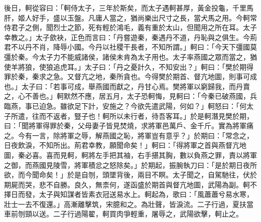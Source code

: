 \documentclass[12pt]{book}
\begin{document}
\begin{pairs}
\begin{Rightside}
\begin{chinese}
\beginnumbering
\pstart
後日，軻從容曰：「軻侍太子，三年於斯矣，而太子遇軻甚厚，黃金投龜，千里馬肝，姬人好手，盛以玉盤。凡庸人當之，猶尚樂出尺寸之長，當犬馬之用。今軻常侍君子之側，聞烈士之節，死有輕於鴻毛，義有重於太山，但聞用之所在耳。太子幸教之。」太子歛袂，正色而言曰：「丹嘗遊秦，秦遇丹不道，丹恥與之俱生。今荊君不以丹不肖，降辱小國。今丹以社稷干長者，不知所謂。」軻曰：「今天下彊國莫彊於秦。今太子力不能威諸侯，諸侯未肯為太子用也。太子率燕國之眾而當之，猶使羊將狼，使狼追虎耳。」太子曰：「丹之憂計久，不知安出？」軻曰：「樊於期得罪於秦，秦求之急。又督亢之地，秦所貪也。今得樊於期首、督亢地圖，則事可成也。」太子曰：「若事可成，舉燕國而獻之，丹甘心焉。樊將軍以窮歸我，而丹賣之，心不善也。」軻默然不應，居五月，太子恐軻悔，見軻曰：「今秦已破燕國，兵臨燕，事已迫急。雖欲足下計，安施之？今欲先遣武陽，何如？」軻怒曰：「何太子所遣，往而不返者，豎子也！軻所以未行者，待吾客耳。」於是軻潛見樊於期，曰：「聞將軍得罪於秦，父母妻子皆見焚燒，求將軍邑萬戶、金千斤。實為將軍痛之。今有一言，除將軍之辱，解燕國之恥，將軍豈有意乎？」於期曰：「常念之，日夜飲淚，不知所出。荊君幸教，願聞命矣！」軻曰：「得將軍之首與燕督亢地圖，秦必喜。喜而見軻，軻將左手把其袖，右手揕其胸，數以負燕之罪，責以將軍之御，而燕國見陵雪，將軍積忿之怒除矣。」於期起，振腕執刀曰：「是於期日夜所欲，而今聞命矣！」於是自刎，頭墜背後，兩目不瞑。太子聞之，自駕馳往，伏於期屍而哭，悲不自勝。良久，無柰何，遂函盛於期首與督亢地圖，武陽為副。軻不擇日而發，太子與知謀者皆素衣冠送易水上。軻起為，歌曰：「風蕭蕭兮易水寒，壯士一去不復還。」高漸離擊筑，宋臆和之。為壯聲，皆淚流。二子行過，夏扶當車前刎頸以送。二子行過陽翟，軻買肉爭輕重，屠辱之，武陽欲擊，軻止之。
\pend
\endnumbering
\end{chinese}
\end{Rightside}
\begin{Leftside}
\begin{fioesjfsoeifj}
\beginnumbering
\pstart

\end{fioesjfsoeifj}
\end{Leftside}
\end{pairs}
\end{document}
